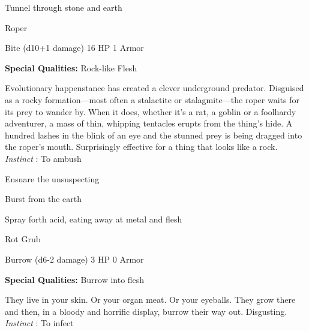          
\item Tunnel through stone and earth

       
\stopitemize
       
\startMonsterName
Roper	 
\stopMonsterName
       

Bite (d10+1 damage)	16 HP	1 Armor

       


       
\startMonsterQualities
         {\bf Special Qualities:}  Rock-like Flesh
\stopMonsterQualities
       
\startMonsterDescription
Evolutionary happenstance has created a clever underground predator. Disguised as a rocky formation—most often a stalactite or stalagmite—the roper waits for its prey to wander by. When it does, whether it’s a rat, a goblin or a foolhardy adventurer, a mass of thin, whipping tentacles erupts from the thing’s hide. A hundred lashes in the blink of an eye and the stunned prey is being dragged into the roper’s mouth. Surprisingly effective for a thing that looks like a rock. {\em Instinct} : To ambush
\stopMonsterDescription
       
\startitemize[1,packed]
         
\item Ensnare the unsuspecting

         
\item Burst from the earth

         
\item Spray forth acid, eating away at metal and flesh

       
\stopitemize
       
\startMonsterName
Rot Grub	 
\stopMonsterName
       

Burrow (d6-2 damage)	3 HP	0 Armor

       


       
\startMonsterQualities
         {\bf Special Qualities:}  Burrow into flesh
\stopMonsterQualities
       
\startMonsterDescription
They live in your skin. Or your organ meat. Or your eyeballs. They grow there and then, in a bloody and horrific display, burrow their way out. Disgusting. {\em Instinct} : To infect
\stopMonsterDescription
       
\startitemize[1,packed]
         
